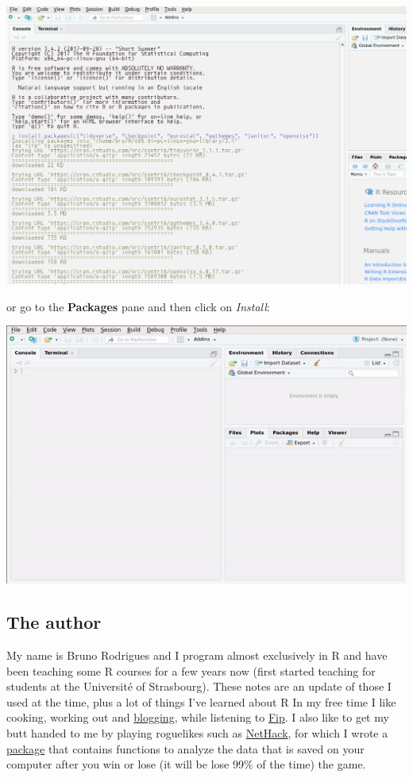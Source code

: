 \documentclass[]{gitbook}
\theoremstyle{definition}
\theoremstyle{definition}
\theoremstyle{definition}
\theoremstyle{remark}
\begin{document}
\includegraphics[width=14.9in]{pics/install_packages}

or go to the \textbf{Packages} pane and then click on \emph{Install}:

\includegraphics{pics/rstudio_install_packages.gif}

\hypertarget{the-author}{%
\subsection*{The author}\label{the-author}}

My name is Bruno Rodrigues and I program almost exclusively in R and
have been teaching some R courses for a few years now (first started
teaching for students at the Université of Strasbourg). These notes are
an update of those I used at the time, plus a lot of things I've learned
about R In my free time I like cooking, working out and
\href{https://www.brodrigues.co}{blogging}, while listening to
\href{http://www.fipradio.fr/player}{Fip}. I also like to get my butt
handed to me by playing roguelikes such as
\href{http://nethack.wikia.com/wiki/NetHack}{NetHack}, for which I wrote
a \href{https://github.com/b-rodrigues/nethack}{package} that contains
functions to analyze the data that is saved on your computer after you
win or lose (it will be lose 99\% of the time) the game.
\end{document}
